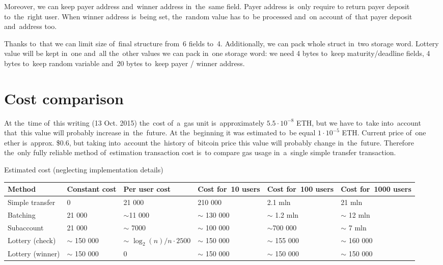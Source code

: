 \documentclass[a4paper]{article}
\begin{document}
        Moreover, we can keep payer address and~winner address in~the~same field. Payer address is~only require to
        return payer deposit to~the~right user. When winner address is~being set, the~random value has to~be
        processed and~on account of~that payer deposit and~address too.

        Thanks to~that we can limit size of~final structure from~6 fields to~4.  Additionally, we can pack whole struct
        in~two storage word. Lottery value will be kept in~one and~all the~other values we can pack in~one storage
        word: we need 4 bytes to~keep maturity/deadline fields, 4 bytes to~keep random variable and~20 bytes to~keep
        payer / winner address.

\section{Cost comparison}
\label{sec:cost}
    At the~time of~this writing (13 Oct. 2015) the~cost of~a~gas unit is~approximately  $5.5 \cdot 10^{-8}$ ETH, but
    we have to~take into~account that~this value will probably increase in~the~future. At the~beginning it was
    estimated to~be equal $1 \cdot 10^{-5}$ ETH. Current price of~one ether is~approx. \$0.6, but taking into~account
    the~history of~bitcoin price this value will probably change in~the~future. Therefore the~only fully reliable
    method of~estimation transaction cost is~to compare gas usage in~a~single simple transfer transaction.

    Estimated cost (neglecting implementation details)

    \begin{tabular}{|p{8em}|p{5em}|p{8em}|p{5em}|p{5em}|p{5em}|}
        \hline
        Method & Constant cost & Per user cost & Cost for~10 users & Cost for~100 users & Cost for~1000 users \\ \hline
        Simple transfer & 0 & 21 000 & 210 000 & 2.1 mln & 21 mln \\ \hline
        Batching & 21 000 & $\sim$11 000 & $\sim$ 130 000 & $\sim$ 1.2 mln & $\sim$ 12 mln \\ \hline
        Subaccount & 21 000 & $\sim$ 7000 & $\sim$ 100 000 & $\sim$700 000 & $\sim$ 7 mln \\ \hline
        Lottery (check) & $\sim$ 150 000 & $\sim$ $\log_2(n)/n \cdot 2500 $ & $\sim$ 150 000 & $\sim$ 155 000 &
        $\sim$ 160 000 \\ \hline
        Lottery (winner) & $\sim$ 150 000 & 0 & $\sim$ 150 000 & $\sim$ 150 000 & $\sim$ 150 000 \\ \hline
    \end{tabular}
\end{document}
